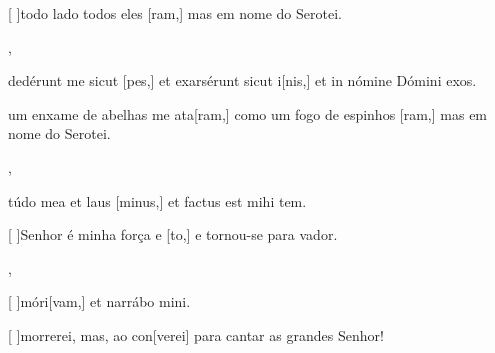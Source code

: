 {    {\item {}[ ]{to}do lado todos eles [ram,] mas em nome do Serotei.~\Antiphona},
  {\item {}dedérunt me sicut [pes,] et exarsérunt sicut i[nis,] et in nómine Dómini exos.~\Antiphona}%
    {\item {} um enxame de abelhas me ata[ram,] como um fogo de espinhos [ram,] mas em nome do Serotei.~\Antiphona},
  {\item {}túdo mea et laus [minus,] et factus est mihi tem.~\Antiphona}%
    {\item {}[ ]{Se}nhor é minha força e [to,] e tornou-se para vador.~\Antiphona},
  {\item {}[ ]{mó}ri[vam,] et narrábo mini.~\Antiphona}%
    {\item {}[ ]{mor}rerei, mas, ao con[verei] para cantar as grandes  Senhor!~\Antiphona}
}